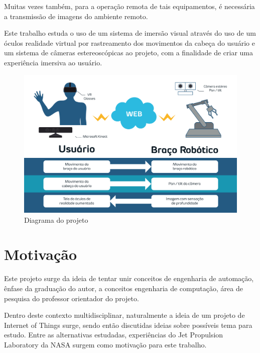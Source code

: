 	 Muitas vezes também, para a operação remota de tais equipamentos, é necessária a transmissão de imagens do ambiente remoto.\par
	 Este trabalho estuda o uso de um sistema de imersão visual através do uso de um óculos realidade virtual por rastreamento dos movimentos da cabeça do usuário e um sistema de câmeras estereoscópicas ao projeto, com a finalidade de criar uma experiência imersiva ao usuário.\par 
	
	 
	
	
	
	
	\begin{figure}[ht!]
		\caption{\label{fig_diagrama}Diagrama do projeto}
		\begin{center}
		\includegraphics[width=\textwidth]{projectchart.pdf}	
		\end{center}
	\end{figure}
	

	
	\section{Motivação}\label{sec-motivacao}
	

	
	Este projeto surge da ideia de tentar unir conceitos de engenharia de automação, ênfase da graduação do autor, a conceitos engenharia de computação, área de pesquisa do professor orientador do projeto.
	
	Dentro deste contexto multidisciplinar, naturalmente a ideia de um projeto de Internet of Things surge, sendo então discutidas ideias sobre possíveis tema para estudo. Entre as alternativas estudadas, experiências do Jet Propulsion Laboratory da NASA\cite{nasa-project} surgem como motivação para este trabalho.
	 

